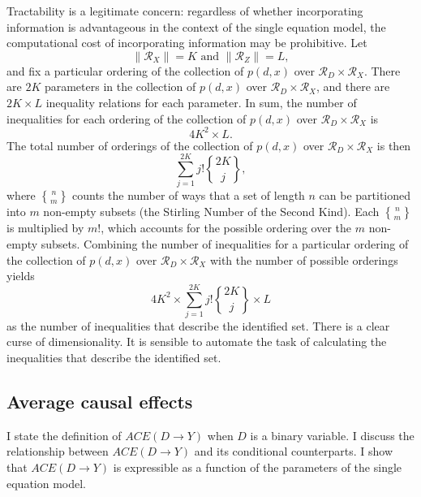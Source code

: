 \documentclass[10pt,a4paper,twoside]{article}
\DeclareRobustCommand{\stirling}{\genfrac\{\}{0pt}{}}
\numberwithin{equation}{section}
\begin{document}
Tractability is a legitimate concern: regardless of whether incorporating information is advantageous in the context of the single equation model, the computational cost of incorporating information may be prohibitive. Let
\[\|\mathcal{R}_X\|=K\text{ and }\|\mathcal{R}_Z\|=L,\]
and fix a particular ordering of the collection of $p(d,x)$ over $\mathcal{R}_D\times\mathcal{R}_X$. There are $2K$ parameters in the collection  of $p(d,x)$ over $\mathcal{R}_D\times\mathcal{R}_X$, and there are $2K\times L$ inequality relations for each parameter. In sum, the number of inequalities for each ordering of the collection of $p(d,x)$ over $\mathcal{R}_D\times\mathcal{R}_X$ is
\[4K^2\times L.\]
The total number of orderings of the collection of $p(d,x)$ over $\mathcal{R}_D\times\mathcal{R}_X$ is then
\[\sum_{j=1}^{2K}j!\stirling{2K}{j},\]
where $\stirling{n}{m}$ counts the number of ways that a set of length $n$ can be partitioned into $m$ non-empty subsets (the Stirling Number of the Second Kind). Each $\stirling{n}{m}$ is multiplied by $m!$, which accounts for the possible ordering over the $m$ non-empty subsets. Combining the number of inequalities for a particular ordering of the collection of $p(d,x)$ over $\mathcal{R}_D\times\mathcal{R}_X$ with the number of possible orderings yields
\[4K^2\times\sum_{j=1}^{2K}j!\stirling{2K}{j}\times L\]
as the number of inequalities that describe the identified set. There is a clear curse of dimensionality. It is sensible to automate the task of calculating the inequalities that describe the identified set.
\subsection{Average causal effects}
I state the definition of $ACE(D\rightarrow Y)$ when $D$ is a binary variable. I discuss the relationship between $ACE(D\rightarrow Y)$ and its conditional counterparts. I show that $ACE(D\rightarrow Y)$ is expressible as a function of the parameters of the single equation model. 
\end{document}
